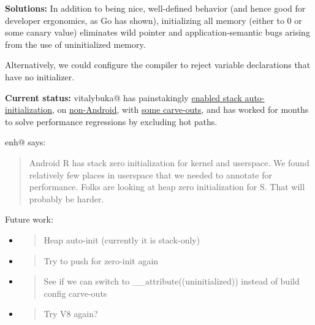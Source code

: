 \documentclass[a4paper,12pt,notitlepage,twoside,openright]{article}
\newcommand{\uline}[1]{#1}
\begin{document}
{\textbf{Solutions:} In addition to being nice, well-defined behavior
(and hence good for developer ergonomics, as Go has shown), initializing
all memory (either to 0 or some canary value) eliminates wild pointer
and application-semantic bugs arising from the use of uninitialized
memory.

Alternatively, we could configure the compiler to reject variable
declarations that have no initializer.

\textbf{Current status:} vitalybuka@ has
painstakingly \href{https://www.google.com/url?q=https://source.chromium.org/chromium/chromium/src/\%2B/master:build/config/compiler/BUILD.gn;l\%3D2583?q\%3Dtrivial-auto-var-init\%26ss\%3Dchromium\&sa=D\&source=editors\&ust=1631944129081000\&usg=AOvVaw3YUck07c2KvA4COd6OlcrS}{\uline{enabled
stack auto-initialization}},
on \href{https://www.google.com/url?q=https://source.chromium.org/chromium/chromium/src/\%2B/master:build/config/compiler/BUILD.gn;l\%3D135?q\%3Dinit_stack_vars\%26ss\%3Dchromium\&sa=D\&source=editors\&ust=1631944129081000\&usg=AOvVaw3V7aEFva0hRGlT4R3821dt}{\uline{non-Android}},
with \href{https://www.google.com/url?q=https://source.chromium.org/search?q\%3Ddefault_init_stack_vars\%26sq\%3D\%26ss\%3Dchromium\&sa=D\&source=editors\&ust=1631944129082000\&usg=AOvVaw3haxLM_dqlDewzY0dHbkc8}{\uline{some
carve-outs}}, and has worked for months to solve performance regressions
by excluding hot paths.

enh@ says:

\begin{quote}
Android R has stack zero initialization for kernel and userspace. We
found relatively few places in userspace that we needed to annotate for
performance. Folks are looking at heap zero initialization for S. That
will probably be harder.
\end{quote}

Future work:

\begin{itemize}
\item
  \begin{quote}
  Heap auto-init (currently it is stack-only)
  \end{quote}
\item
  \begin{quote}
  Try to push for zero-init again
  \end{quote}
\item
  \begin{quote}
  See if we can switch to \_\_attribute((uninitialized)) instead of
  build config carve-outs
  \end{quote}
\item
  \begin{quote}
  Try V8 again?
  \end{quote}
\end{itemize}

}
\end{document}
